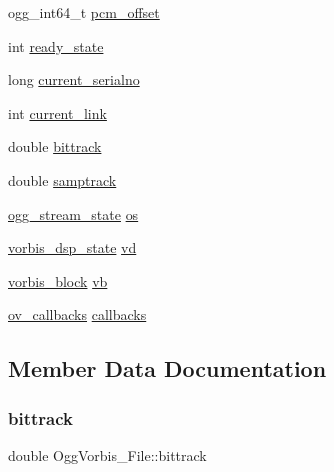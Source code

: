 \begin{DoxyCompactItemize}
\item 
ogg\+\_\+int64\+\_\+t \hyperlink{struct_ogg_vorbis___file_a23d5ba7ca52640ceb6f633a46304cdc5}{pcm\+\_\+offset}
\item 
int \hyperlink{struct_ogg_vorbis___file_ad304fe18bebc075c34f2e5ec7d1f2a99}{ready\+\_\+state}
\item 
long \hyperlink{struct_ogg_vorbis___file_ad7545f86b92a6d66641f3d04a2497763}{current\+\_\+serialno}
\item 
int \hyperlink{struct_ogg_vorbis___file_a9b2d64c3739364ac4c08070aac2e0588}{current\+\_\+link}
\item 
double \hyperlink{struct_ogg_vorbis___file_aa72a11d9f154636d4dc9edac4c9eb843}{bittrack}
\item 
double \hyperlink{struct_ogg_vorbis___file_a3fcbfeaad027ada99496dfcaf94866a9}{samptrack}
\item 
\hyperlink{structogg__stream__state}{ogg\+\_\+stream\+\_\+state} \hyperlink{struct_ogg_vorbis___file_a8658f17a6f662a74f8763c47d560d712}{os}
\item 
\hyperlink{structvorbis__dsp__state}{vorbis\+\_\+dsp\+\_\+state} \hyperlink{struct_ogg_vorbis___file_acb9d38719f54642d1a39f24203b466d6}{vd}
\item 
\hyperlink{structvorbis__block}{vorbis\+\_\+block} \hyperlink{struct_ogg_vorbis___file_a3201599977a781b7bf559167cd892638}{vb}
\item 
\hyperlink{structov__callbacks}{ov\+\_\+callbacks} \hyperlink{struct_ogg_vorbis___file_afb1474e24193f577dd21395a76199415}{callbacks}
\end{DoxyCompactItemize}


\subsection{Member Data Documentation}
\mbox{\label{struct_ogg_vorbis___file_aa72a11d9f154636d4dc9edac4c9eb843}} 
\subsubsection{\texorpdfstring{bittrack}{bittrack}}
{\footnotesize\ttfamily double Ogg\+Vorbis\+\_\+\+File\+::bittrack}

\mbox{\label{struct_ogg_vorbis___file_afb1474e24193f577dd21395a76199415}} 
